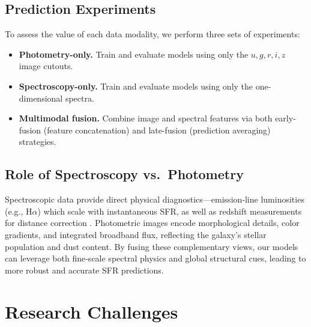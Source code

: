 \documentclass[english,bachelor,oneside]{ctufit-thesis}
\begin{document}
\subsection{Prediction Experiments}
To assess the value of each data modality, we perform three sets of experiments:
\begin{itemize}
  \item \textbf{Photometry-only.} Train and evaluate models using only the $u,g,r,i,z$ image cutouts.
  \item \textbf{Spectroscopy-only.} Train and evaluate models using only the one-dimensional spectra.
  \item \textbf{Multimodal fusion.} Combine image and spectral features via both early-fusion (feature concatenation) and late-fusion (prediction averaging) strategies.
\end{itemize}

\subsection{Role of Spectroscopy vs.\ Photometry} %
Spectroscopic data provide direct physical diagnostics—emission‐line luminosities (e.g., H$\alpha$)  
which scale with instantaneous SFR, as well as redshift measurements for distance correction  
\cite{kennicutt1998star}. Photometric images encode morphological details, color gradients, and  
integrated broadband flux, reflecting the galaxy’s stellar population and dust content.  
By fusing these complementary views, our models can leverage both fine‐scale spectral physics  
and global structural cues, leading to more robust and accurate SFR predictions.

\section{Research Challenges}
\end{document}
